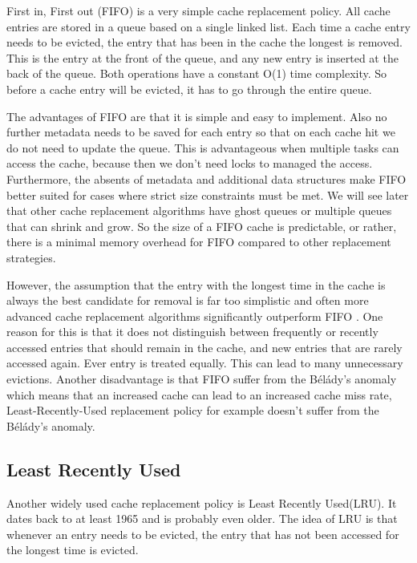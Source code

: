 \documentclass[
	12pt,
	a4paper,
	abstract,
	bibliography=totoc,
	chapterprefix,
	headings=openright,
	numbers=endperiod,
	parskip=half,
	twoside,
]{scrreprt}
\begin{document}
First in, First out (FIFO) is a very simple cache replacement policy.
All cache entries are stored in a queue based on a single linked list.
Each time a cache entry needs to be evicted, the entry that has been in the cache the longest is removed.
This is the entry at the front of the queue, and any new entry is inserted at the back of the queue. Both operations have a constant O(1) time complexity.
So before a cache entry will be evicted, it has to go through the entire queue.

The advantages of FIFO are that it is simple and easy to implement.
Also no further metadata needs to be saved for each entry so that on each cache hit we do not need to update the queue.
This is advantageous when multiple tasks can access the cache, because then 
we don't need locks to managed the access.
Furthermore, the absents of metadata and additional data structures make FIFO better suited for cases where strict size constraints must be met. 
We will see later that other cache replacement algorithms have ghost queues or multiple queues that can shrink and grow. So the size 
of a FIFO cache is predictable, or rather, there is a minimal memory overhead for FIFO compared to other replacement strategies.

However, the assumption that the entry with the longest time in the cache is always the best candidate for removal is far too 
simplistic and often more advanced cache replacement algorithms significantly outperform FIFO \cite{van1992lru}.
One reason for this is that it does not distinguish between frequently or recently accessed entries that should remain in the cache, and new entries that are rarely accessed again. Ever entry is treated equally. This can lead to many unnecessary evictions.
Another disadvantage is that FIFO suffer from the Bélády's anomaly \cite{10.1145/363011.363155} which means that an increased cache can lead to an increased cache miss rate, Least-Recently-Used replacement policy for example doesn't suffer from the Bélády's anomaly.

\subsection{Least Recently Used}
Another widely used cache replacement policy is Least Recently Used(LRU).
It dates back to at least 1965 \cite{denning1980working} and is probably even older.
The idea of LRU is that whenever an entry needs to be evicted, the entry that has not been accessed for the longest time is evicted.
\end{document}
